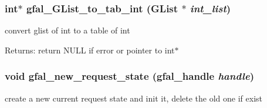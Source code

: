 \subsubsection{\setlength{\rightskip}{0pt plus 5cm}int$\ast$ gfal\_\-GList\_\-to\_\-tab\_\-int (GList $\ast$ {\em int\_\-list})}\label{gfal__common__internal_8h_87219c9e2c6323b67c2ac70354ee2645}


convert glist of int to a table of int 

\begin{Desc}
\item[Returns:]return NULL if error or pointer to int$\ast$ \end{Desc}
\subsubsection{\setlength{\rightskip}{0pt plus 5cm}void gfal\_\-new\_\-request\_\-state (gfal\_\-handle {\em handle})}\label{gfal__common__internal_8h_3453c8a22faa54f7bf3278d5ecd7785d}


create a new current request state and init it, delete the old one if exist 
